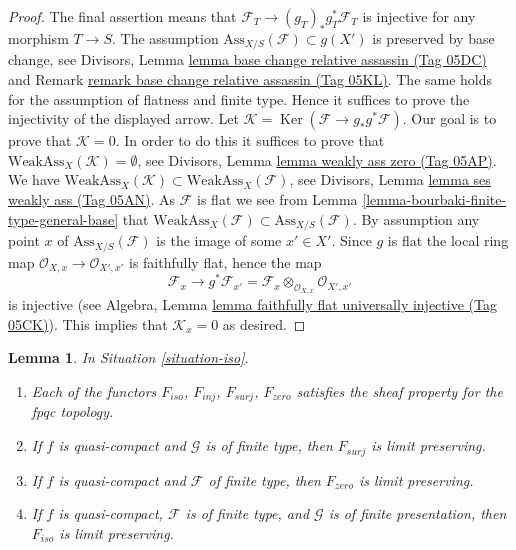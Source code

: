 \documentclass{amsart}
\theoremstyle{plain}
\newtheorem{lemma}[subsection]{Lemma}
\theoremstyle{definition}
\theoremstyle{remark}
\numberwithin{equation}{subsection}
\def\Ker{\mathop{\mathrm{Ker}}}
\begin{document}
\begin{proof}
The final assertion means that $\mathcal{F}_T \to (g_T)_*g_T^*\mathcal{F}_T$
is injective for any morphism $T \to S$. The assumption
$\text{Ass}_{X/S}(\mathcal{F}) \subset g(X')$ is preserved by base change, see
Divisors, Lemma \href{https://stacks.math.columbia.edu/tag/05DC}{lemma base change relative assassin (Tag 05DC)} and
Remark \href{https://stacks.math.columbia.edu/tag/05KL}{remark base change relative assassin (Tag 05KL)}.
The same holds for the assumption of flatness and finite type.
Hence it suffices to prove the injectivity of the displayed arrow.
Let $\mathcal{K} = \Ker(\mathcal{F} \to g_*g^*\mathcal{F})$.
Our goal is to prove that $\mathcal{K} = 0$.
In order to do this it suffices to prove that
$\text{WeakAss}_X(\mathcal{K}) = \emptyset$, see
Divisors, Lemma \href{https://stacks.math.columbia.edu/tag/05AP}{lemma weakly ass zero (Tag 05AP)}.
We have
$\text{WeakAss}_X(\mathcal{K}) \subset \text{WeakAss}_X(\mathcal{F})$, see
Divisors, Lemma \href{https://stacks.math.columbia.edu/tag/05AN}{lemma ses weakly ass (Tag 05AN)}.
As $\mathcal{F}$ is flat we see from
Lemma \ref{lemma-bourbaki-finite-type-general-base}
that $\text{WeakAss}_X(\mathcal{F}) \subset \text{Ass}_{X/S}(\mathcal{F})$.
By assumption any point $x$ of $\text{Ass}_{X/S}(\mathcal{F})$
is the image of some $x' \in X'$. Since $g$ is flat the
local ring map $\mathcal{O}_{X, x} \to \mathcal{O}_{X', x'}$
is faithfully flat, hence the map
$$
\mathcal{F}_x
\longrightarrow
g^*\mathcal{F}_{x'} =
\mathcal{F}_x \otimes_{\mathcal{O}_{X, x}} \mathcal{O}_{X', x'}
$$
is injective (see
Algebra, Lemma \href{https://stacks.math.columbia.edu/tag/05CK}{lemma faithfully flat universally injective (Tag 05CK)}).
This implies that $\mathcal{K}_x = 0$ as desired.
\end{proof}


\begin{lemma}
\label{lemma-iso-sheaf}
In Situation \ref{situation-iso}.
\begin{enumerate}
\item Each of the functors $F_{iso}$, $F_{inj}$, $F_{surj}$, $F_{zero}$
satisfies the sheaf property for the fpqc topology.
\item If $f$ is quasi-compact and $\mathcal{G}$ is of finite type,
then $F_{surj}$ is limit preserving.
\item If $f$ is quasi-compact and $\mathcal{F}$ of finite type, then
$F_{zero}$ is limit preserving.
\item If $f$ is quasi-compact, $\mathcal{F}$ is of finite type, and
$\mathcal{G}$ is of finite presentation, then $F_{iso}$ is limit preserving.
\end{enumerate}
\end{lemma}
\end{document}
